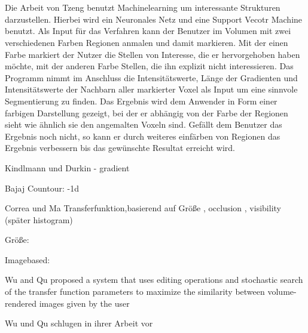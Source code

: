 \chapter{}
\label{sec:state_of_the_art}



Die Arbeit von Tzeng \cite{tzeng2005intelligent} benutzt Machinelearning um interessante Strukturen darzustellen. Hierbei wird ein Neuronales Netz und eine Support Vecotr Machine benutzt.
\newline
Als Input für das Verfahren kann der Benutzer im Volumen mit zwei verschiedenen Farben Regionen anmalen und damit markieren. Mit der einen Farbe markiert der Nutzer die Stellen von Interesse, die er hervorgehoben haben möchte, mit der anderen Farbe Stellen, die ihn explizit nicht interessieren. Das Programm nimmt im Anschluss die Intensitätswerte, Länge der Gradienten und Intensitätswerte der Nachbarn aller markierter Voxel als Input um eine sinnvole Segmentierung zu finden. Das Ergebnis wird dem Anwender in Form einer farbigen Darstellung gezeigt, bei der er abhängig von der Farbe der Regionen sieht wie ähnlich sie den angemalten Voxeln sind. Gefällt dem Benutzer das Ergebnis noch nicht, so kann er durch weiteres einfärben von Regionen das Ergebnis verbessern bis das gewünschte Resultat erreicht wird.











Kindlmann und Durkin  \cite{kindlmann1998semi} - gradient


Bajaj Countour: \cite{bajaj1997contour} -1d


Correa und Ma Transferfunktion,basierend auf Größe \cite{correa2008size}, occlusion \cite{correa2009occlusion}, visibility \cite{correa2009visibility}(später histogram\cite{correa2011visibility})


Größe: 




Imagebased:

 
Wu and Qu
proposed a system that uses editing operations and stochastic
search of the transfer function parameters to maximize the
similarity between volume-rendered images given by the user

Wu und Qu schlugen in ihrer Arbeit vor \cite{wu2007interactive}


